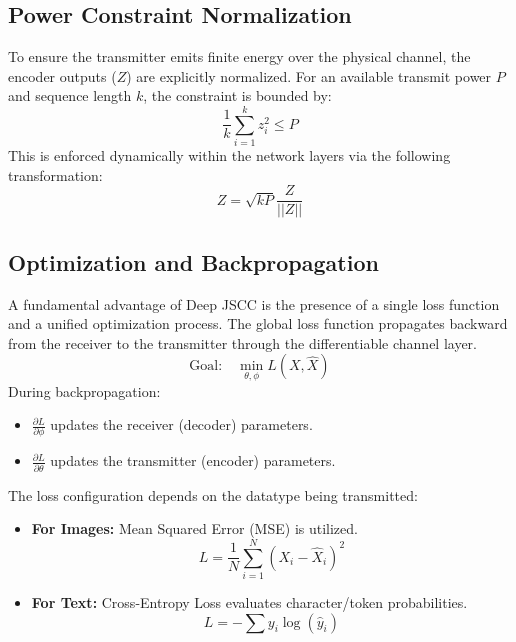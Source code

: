 \documentclass[10pt, conference]{IEEEtran}
\begin{document}
\subsection{\textbf{Power Constraint Normalization}}
To ensure the transmitter emits finite energy over the physical channel, the encoder outputs ($Z$) are explicitly normalized. For an available transmit power $P$ and sequence length $k$, the constraint is bounded by:
\begin{equation}
    \frac{1}{k} \sum_{i=1}^{k} z_i^2 \leq P
\end{equation}
This is enforced dynamically within the network layers via the following transformation:
\begin{equation}
    Z = \sqrt{kP} \frac{Z}{||Z||}
\end{equation}

\subsection{\textbf{Optimization and Backpropagation}}
A fundamental advantage of Deep JSCC is the presence of a single loss function and a unified optimization process. The global loss function propagates backward from the receiver to the transmitter through the differentiable channel layer.
\begin{equation}
    \text{Goal:} \quad \min_{\theta, \phi} L(X, \hat{X})
\end{equation}
During backpropagation:
\begin{itemize}
    \item $\frac{\partial L}{\partial \phi}$ updates the receiver (decoder) parameters.
    \item $\frac{\partial L}{\partial \theta}$ updates the transmitter (encoder) parameters.
\end{itemize}

The loss configuration depends on the datatype being transmitted:
\begin{itemize}
    \item \textbf{For Images:} Mean Squared Error (MSE) is utilized.
    \begin{equation}
        L = \frac{1}{N} \sum_{i=1}^N (X_i - \hat{X}_i)^2
    \end{equation}
    \item \textbf{For Text:} Cross-Entropy Loss evaluates character/token probabilities.
    \begin{equation}
        L = - \sum y_i \log(\hat{y}_i)
    \end{equation}
\end{itemize}
\end{document}
